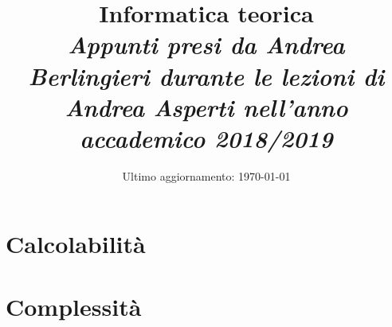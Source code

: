 \documentclass{report}
\begin{document}
\title{ Informatica teorica \\
        \normalsize \it Appunti presi da Andrea Berlingieri durante le lezioni di Andrea Asperti
        nell'anno accademico 2018/2019}
\date{Ultimo aggiornamento: \today}
\maketitle



\tableofcontents
%
\part{Calcolabilità}










\part{Complessità}






%
%
%
%
%
\end{document}
